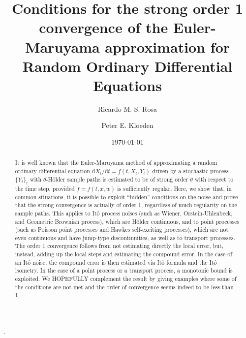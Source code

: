 \documentclass[reqno,12pt]{amsart}
\theoremstyle{plain}%
\theoremstyle{definition}
\begin{document}


\title[Strong order 1 convergence of Euler-Maruyama for Random ODEs]{Conditions for the strong order 1 convergence of the Euler-Maruyama approximation for Random Ordinary Differential Equations}

\author[R. M. S. Rosa]{Ricardo M. S. Rosa}

\author[P. E. Kloeden]{Peter E. Kloeden}

\address[Ricardo M. S. Rosa]{Instituto de Matem\'atica, Universidade Federal do Rio de Janeiro, Brazil}
\address[Peter E. Kloeden]{Mathematics Department, University of Tubingen, Germany}


\date{\today}


.

\begin{abstract}
It is well known that the Euler-Maruyama method of approximating a random ordinary differential equation $\mathrm{d}X_t/\mathrm{d}t = f(t, X_t, Y_t)$ driven by a stochastic process $\{Y_t\}_t$ with $\theta$-H\"older sample paths is estimated to be of strong order $\theta$ with respect to the time step, provided $f=f(t, x, w)$ is sufficiently regular. Here, we show that, in common situations, it is possible to exploit ``hidden'' conditions on the noise and prove that the strong convergence is actually of order 1, regardless of much regularity on the sample paths. This applies to It\^o process noises (such as Wiener, Orstein-Uhlenbeck, and Geometric Brownian process), which are H\"older continuous, and to point processes (such as Poisson point processes and Hawkes self-exciting processes), which are not even continuous and have jump-type discontinuities, as well as to transport processes. The order 1 convergence follows from not estimating directly the local error, but, instead, adding up the local steps and estimating the compound error. In the case of an It\^o noise, the compound error is then estimated via It\^o formula and the It\^o isometry. In the case of a point process or a transport process, a monotonic bound is exploited. We HOPEFULLY complement the result by giving examples where some of the conditions are not met and the order of convergence seems indeed to be less than 1.
\end{abstract}
\end{document}
